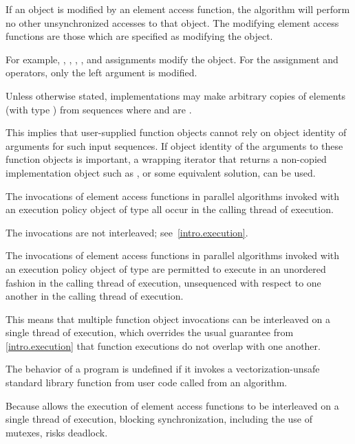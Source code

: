 \pnum
If an object is modified by an element access function,
the algorithm will perform no other unsynchronized accesses to that object.
The modifying element access functions are those
which are specified as modifying the object.
\begin{note}
For example,
,
\tcode{++},
\tcode{--},
, and
assignments
modify the object.
For the assignment and  operators, only the left argument is modified.
\end{note}

\pnum
Unless otherwise stated, implementations may make arbitrary copies of elements
(with type ) from sequences
where 
and  are .
\begin{note}
This implies that user-supplied function objects cannot rely on
object identity of arguments for such input sequences.
If object identity of the arguments to these function objects
is important, a wrapping iterator
that returns a non-copied implementation object
such as ,
or some equivalent solution, can be used.
\end{note}

\pnum
The invocations of element access functions in parallel algorithms invoked with
an execution policy object of type  all occur
in the calling thread of execution.
\begin{note}
The invocations are not interleaved; see~\ref{intro.execution}.
\end{note}

\pnum
The invocations of element access functions in parallel algorithms invoked with
an execution policy object of type 
are permitted to execute in an unordered fashion
in the calling thread of execution,
unsequenced with respect to one another in the calling thread of execution.
\begin{note}
This means that multiple function object invocations
can be interleaved on a single thread of execution,
which overrides the usual guarantee from \ref{intro.execution}
that function executions do not overlap with one another.
\end{note}
The behavior of a program is undefined if
it invokes a vectorization-unsafe standard library function
from user code
called from an  algorithm.
\begin{note}
Because  allows
the execution of element access functions
to be interleaved on a single thread of execution,
blocking synchronization, including the use of mutexes, risks deadlock.
\end{note}

